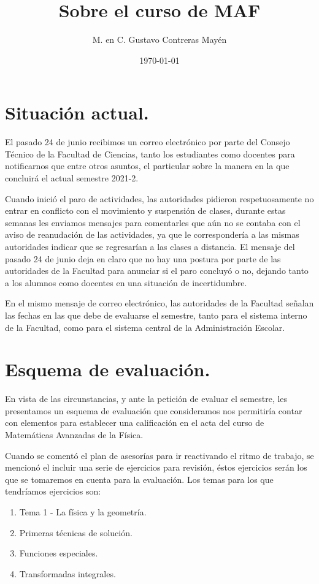 
\title{Sobre el curso de MAF} \vspace{-3ex}
\author{M. en C. Gustavo Contreras Mayén}
\date{\today}
\newcommand{\Cancel}[2][black]{{\color{#1}\cancel{\color{black}#2}}}

\vspace{-4cm}
\maketitle
\fontsize{14}{14}\selectfont

\section{Situación actual.}

El pasado 24 de junio recibimos un correo electrónico por parte del Consejo Técnico de la Facultad de Ciencias, tanto los estudiantes como docentes para notificarnos que entre otros asuntos, el particular sobre la manera en la que concluirá el actual semestre 2021-2.
\par
Cuando inició el paro de actividades, las autoridades pidieron respetuosamente no entrar en conflicto con el movimiento y suspensión de clases, durante estas semanas les enviamos mensajes para comentarles que aún no se contaba con el aviso de reanudación de las actividades, ya que le correspondería a las mismas autoridades indicar que se regresarían a las clases a distancia. El mensaje del pasado 24 de junio deja en claro que no hay una postura por parte de las autoridades de la Facultad para anunciar si el paro concluyó o no, dejando tanto a los alumnos como docentes en una situación de incertidumbre.
\par
En el mismo mensaje de correo electrónico, las autoridades de la Facultad señalan las fechas en las que debe de evaluarse el semestre, tanto para el sistema interno de la Facultad, como para el sistema central de la Administración Escolar.

\section{Esquema de evaluación.}

En vista de las circunstancias, y ante la petición de evaluar el semestre, les presentamos un esquema de evaluación que consideramos nos permitiría contar con elementos para establecer una calificación en el acta del curso de Matemáticas Avanzadas de la Física.
\par
Cuando se comentó el plan de asesorías para ir reactivando el ritmo de trabajo, se mencionó el incluir una serie de ejercicios para revisión, éstos ejercicios serán los que se tomaremos en cuenta para la evaluación. Los temas para los que tendríamos ejercicios son:
\begin{enumerate}
\item Tema 1 - La física y la geometría.
\item Primeras técnicas de solución.
\item Funciones especiales.
\item Transformadas integrales.
\end{enumerate}

